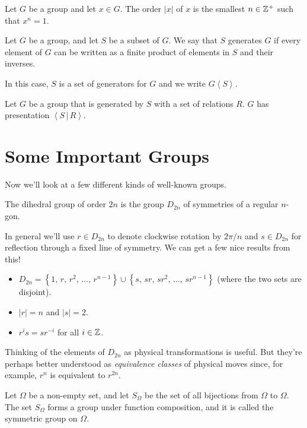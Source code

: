 \documentclass[../m171main.tex]{subfiles}
\begin{document}
\begin{definition}
    Let $G$ be a group and let $x \in G$.
    The order $|x|$ of $x$ is the smallest $n \in \mathbb{Z}^+$ such that $x^{n} = 1$.
\end{definition}

\begin{definition}[Generator]
    Let $G$ be a group, and let $S$ be a subset of $G$.
    We say that $S$ generates $G$ if every element of $G$ can be written as a finite product of elements in $S$ and their inverses.

    In this case, $S$ is a set of generators for $G$ and we write $G \left< S \right>$.
\end{definition}

\begin{definition}[Presentation]
    Let $G$ be a group that is generated by $S$ with a set of relations $R$.
    $G$ has presentation $\left< S \,|\, R \right>$.
\end{definition}

\section{Some Important Groups}
Now we'll look at a few different kinds of well-known groups.

\begin{definition}
    The dihedral group of order $2n$ is the group $D_{2n}$ of symmetries of a regular $n$-gon.
\end{definition}

In general we'll use $r \in D_{2n}$ to denote clockwise rotation by $2\pi / n$ and $s \in D_{2n}$ for reflection through a fixed line of symmetry.
We can get a few nice results from this!
\begin{itemize}
    \item $D_{2n} = \left\{ 1, \, r, \, r^2, \, \ldots, \, r^{n-1} \right\} \cup \left\{ s, \, sr, \, sr^2, \, \ldots, \, sr^{n-1} \right\}$ (where the two sets are disjoint).
    \item $|r| = n$ and $|s| = 2$.
    \item $r^{i} s = s r^{-i}$ for all $i \in \mathbb{Z}$.
\end{itemize}
Thinking of the elements of $D_{2n}$ as physical transformations is useful.
But they're perhaps better understood as \textit{equivalence classes} of physical moves since, for example, $r^{n}$ is equivalent to $r^{2n}$.

\begin{definition}
    Let $\Omega$ be a non-empty set, and let $S_\Omega$ be the set of all bijections from $\Omega$ to $\Omega$.
    The set $S_\Omega$ forms a group under function composition, and it is called the symmetric group on $\Omega$.
\end{definition}
\end{document}
